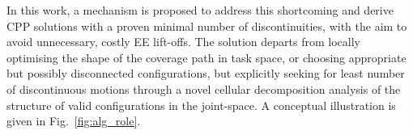 \documentclass[journal]{IEEEtran}
\begin{document}
In this work, a mechanism is proposed to address this shortcoming and derive CPP solutions with a proven minimal number of discontinuities, with the aim to avoid unnecessary, costly EE lift-offs. 
The solution departs from locally optimising the shape of the coverage path in task space, or choosing appropriate but possibly disconnected configurations, but explicitly seeking for least number of discontinuous motions through a novel cellular decomposition analysis of the structure of valid configurations in the joint-space. A conceptual illustration is given in Fig.~\ref{fig:alg_role}.
%

\end{document}
